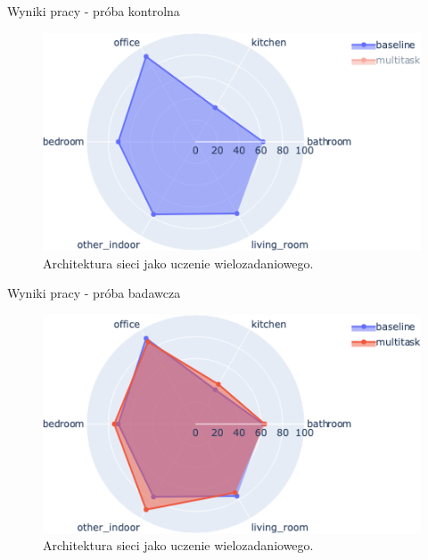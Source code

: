 \documentclass[10pt]{beamer}
\begin{document}
\begin{frame}{Wyniki pracy - próba kontrolna}
        
    \begin{figure}
        \includegraphics[width=\textwidth]{images/classification_polar_baseline.png}
        \caption{Architektura sieci jako uczenie wielozadaniowego.}
    \end{figure}
\end{frame}
\begin{frame}{Wyniki pracy - próba badawcza}
    \begin{figure}
        \includegraphics[width=\textwidth]{images/classification_polar.png}
        \caption{Architektura sieci jako uczenie wielozadaniowego.}
    \end{figure}
\end{frame}
\end{document}
